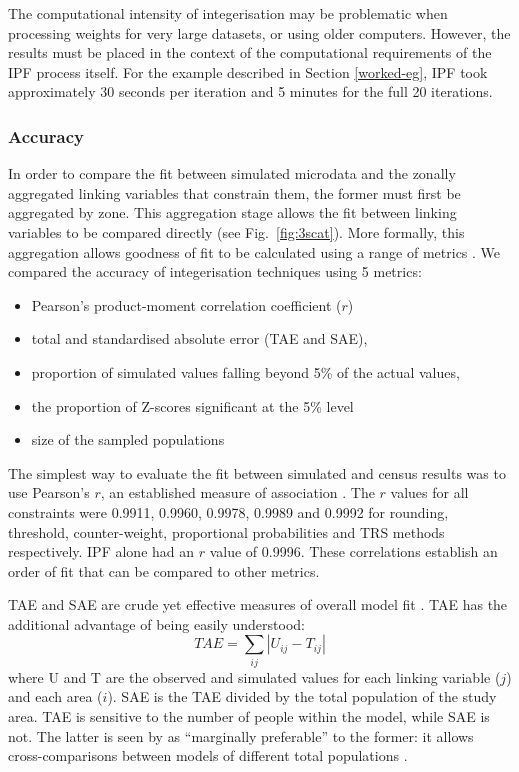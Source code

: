 The computational intensity of integerisation may
be problematic when processing weights for very large
datasets, or using older computers. However, the results must be placed in
the context of the computational requirements of the IPF process itself. For the
example described in Section \ref{worked-eg}, IPF took approximately
30 seconds per iteration and 5 minutes for the full 20 iterations.

\subsubsection{Accuracy}
In order to compare the fit between simulated microdata and the zonally
aggregated linking variables that constrain them, the former must first be
aggregated by zone. This aggregation stage allows the fit between linking
variables to be compared directly (see Fig.~\ref{fig:3scat}). More
formally, this aggregation allows goodness of fit to be calculated using a range
of metrics \citep{Williamson1998}. We compared the accuracy of integerisation
techniques using 5 metrics:
\begin{itemize}
\item Pearson's product-moment correlation coefficient ($r$)
\item total and standardised absolute error (TAE and SAE),
\item proportion of simulated values falling beyond 5\% of the actual values,
\item the proportion of Z-scores significant at the 5\% level
\item size of the sampled populations
\end{itemize}

The simplest way to evaluate the fit between simulated and census results
was to use Pearson's $r$, an established measure of association
\citep{Rodgers1988}.
The $r$ values for all constraints were 0.9911, 0.9960, 0.9978,
0.9989 and 0.9992 for rounding, threshold, counter-weight, proportional
probabilities and TRS
methods respectively. IPF alone had an $r$ value of 0.9996. These correlations
establish an order of fit that can be compared to other metrics.

TAE and SAE are crude yet effective measures of overall
model fit \citep{Voas2001}. TAE has the additional advantage of
being easily understood:
\begin{equation}
 TAE = \sum\limits_{ij}|U_{ij} - T_{ij}|
 \label{etae}
\end{equation}
where U and T are the observed and simulated values for each linking variable
($j$) and each area ($i$).
SAE is the TAE divided by the total
population of the study area. TAE is sensitive to the number of people
within the model, while SAE is not. The latter is seen by \citet{Voas2001} as
``marginally preferable'' to the former: it allows cross-comparisons between
models of different total populations \citep{Kongmuang2006-thesis}.

